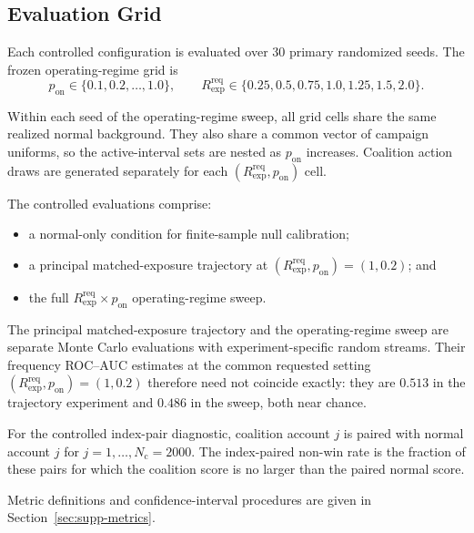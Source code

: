 
\subsection{Evaluation Grid}
\label{sec:supp-rotation-evaluation}

Each controlled configuration is evaluated over 30 primary randomized seeds.
The frozen operating-regime grid is
\[
p_{\mathrm{on}}\in\{0.1,0.2,\ldots,1.0\},
\qquad
R_{\mathrm{exp}}^{\mathrm{req}}
\in\{0.25,0.5,0.75,1.0,1.25,1.5,2.0\}.
\]

Within each seed of the operating-regime sweep, all grid cells share the
same realized normal background. They also share a common vector of campaign
uniforms, so the active-interval sets are nested as $p_{\mathrm{on}}$
increases. Coalition action draws are generated separately for each
$(R_{\mathrm{exp}}^{\mathrm{req}},p_{\mathrm{on}})$ cell.

The controlled evaluations comprise:
\begin{itemize}
    \item a normal-only condition for finite-sample null calibration;
    \item a principal matched-exposure trajectory at
          $(R_{\mathrm{exp}}^{\mathrm{req}},p_{\mathrm{on}})=(1,0.2)$;
          and
    \item the full
          $R_{\mathrm{exp}}^{\mathrm{req}}\times p_{\mathrm{on}}$
          operating-regime sweep.
\end{itemize}

The principal matched-exposure trajectory and the operating-regime sweep
are separate Monte Carlo evaluations with experiment-specific random streams.
Their frequency ROC--AUC estimates at the common requested setting
$(R_{\mathrm{exp}}^{\mathrm{req}},p_{\mathrm{on}})=(1,0.2)$ therefore
need not coincide exactly: they are $0.513$ in the trajectory experiment
and $0.486$ in the sweep, both near chance.

For the controlled index-pair diagnostic, coalition account $j$ is paired
with normal account $j$ for $j=1,\ldots,N_{\mathrm c}=2000$. The
index-paired non-win rate is the fraction of these pairs for which the
coalition score is no larger than the paired normal score.

Metric definitions and confidence-interval procedures are given in
Section~\ref{sec:supp-metrics}.

